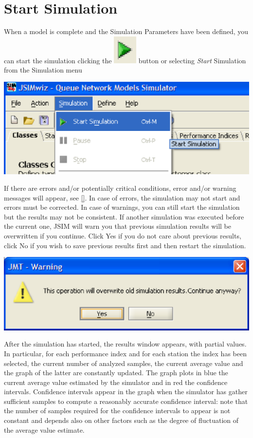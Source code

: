 \section{Start Simulation}
\label{sec:StartSimulation}
When a model is complete and the Simulation Parameters have been defined, you can start the simulation clicking the \includegraphics[scale=.5]{img/jsim/start2.eps} button or selecting \emph{Start} Simulation from the Simulation menu
\begin{center}
\includegraphics[scale=.5]{img/jsim/start1.eps}
\end{center}
If there are errors and/or potentially critical conditions, error and/or warning messages will appear, see \autoref{}. In case of errors, the simulation may not start
and errors must be corrected. In case of warnings, you can still start the simulation but the results may not be consistent.
If another simulation was executed before the current one, JSIM will warn you that previous simulation results will be overwritten if you continue. Click Yes if you do not care about previous results, click No if you wish to save previous results first and then restart the simulation.
\begin{center}
\includegraphics[scale=.5]{img/jsim/confirm.eps}
\end{center}
After the simulation has started, the results window appears, with partial values. In particular, for each performance index and for each station the index has been selected, the current number of analyzed samples, the current average value and the graph of the latter are constantly updated. The graph plots in blue the current average value estimated by the simulator and in red the confidence intervals. Confidence intervals appear in the graph when the simulator has gather sufficient samples to compute a reasonably accurate confidence interval: note that the number of samples required for the confidence intervals to appear is not constant and depends also on other factors such as the degree of fluctuation of the average value estimate.
